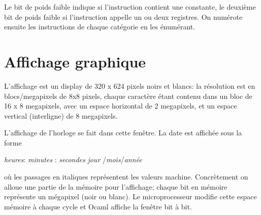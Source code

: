 \documentclass[12pt,a4paper,french]{article}
\begin{document}
\;


Le bit de poids faible indique si l'instruction contient une constante, le deuxième bit de poids faible si l'instruction appelle un ou deux registres.
On numérote ensuite les instructions de chaque catégorie en les énumérant. 

\section{Affichage graphique}

L'affichage est un display de 320 x 624 pixels noirs et blancs: la résolution est en blocs/megapixels de 8x8 pixels, chaque caractère étant contenu dans un bloc de 16 x 8 megapixels, avec un espace horizontal de 2 megapixels, et un espace vertical (interligne) de 8 megapixels.

L'affichage de l'horloge se fait dans cette fenêtre. La date est affichée sous la forme 

\textit {heures}: \textit {minutes} : \textit {secondes}  \newline \textit {jour} /\textit {mois}/\textit {année} 


où les passages en italiques représentent les valeurs machine.
Concrètement on alloue une partie de la mémoire pour l'affichage; chaque bit en mémoire représente un mégapixel (noir ou blanc). Le microprocesseur modifie cette espace mémoire à chaque cycle et Ocaml affiche la fenêtre bit à bit.
\end{document}
